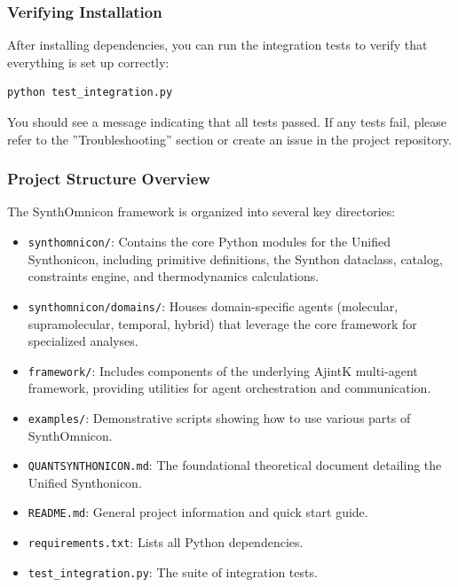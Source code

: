 \documentclass[12pt,a4paper]{article}
\begin{document}
\subsubsection{Verifying Installation}

After installing dependencies, you can run the integration tests to verify that everything is set up correctly:

\begin{lstlisting}[language=bash]
python test_integration.py
\end{lstlisting}

You should see a message indicating that all tests passed. If any tests fail, please refer to the ''Troubleshooting'' section or create an issue in the project repository.

\subsubsection{Project Structure Overview}

The SynthOmnicon framework is organized into several key directories:

\begin{itemize}
    \item \texttt{synthomnicon/}: Contains the core Python modules for the Unified Synthonicon, including primitive definitions, the Synthon dataclass, catalog, constraints engine, and thermodynamics calculations.
    \item \texttt{synthomnicon/domains/}: Houses domain-specific agents (molecular, supramolecular, temporal, hybrid) that leverage the core framework for specialized analyses.
    \item \texttt{framework/}: Includes components of the underlying AjintK multi-agent framework, providing utilities for agent orchestration and communication.
    \item \texttt{examples/}: Demonstrative scripts showing how to use various parts of SynthOmnicon.
    \item \texttt{QUANTSYNTHONICON.md}: The foundational theoretical document detailing the Unified Synthonicon.
    \item \texttt{README.md}: General project information and quick start guide.
    \item \texttt{requirements.txt}: Lists all Python dependencies.
    \item \texttt{test\_integration.py}: The suite of integration tests.
\end{itemize}
\end{document}
